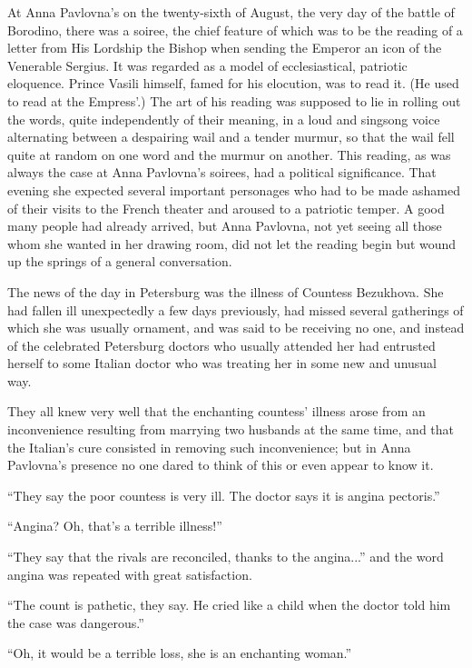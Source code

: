 At Anna Pavlovna's on the twenty-sixth of August, the very day of
the battle of Borodino, there was a soiree, the chief feature of
which was to be the reading of a letter from His Lordship the
Bishop when sending the Emperor an icon of the Venerable
Sergius. It was regarded as a model of ecclesiastical, patriotic
eloquence. Prince Vasili himself, famed for his elocution, was to
read it. (He used to read at the Empress'.) The art of his
reading was supposed to lie in rolling out the words, quite
independently of their meaning, in a loud and singsong voice
alternating between a despairing wail and a tender murmur, so
that the wail fell quite at random on one word and the murmur on
another. This reading, as was always the case at Anna Pavlovna's
soirees, had a political significance. That evening she expected
several important personages who had to be made ashamed of their
visits to the French theater and aroused to a patriotic temper. A
good many people had already arrived, but Anna Pavlovna, not yet
seeing all those whom she wanted in her drawing room, did not let
the reading begin but wound up the springs of a general
conversation.

The news of the day in Petersburg was the illness of Countess
Bezukhova.  She had fallen ill unexpectedly a few days
previously, had missed several gatherings of which she was
usually ornament, and was said to be receiving no one, and
instead of the celebrated Petersburg doctors who usually attended
her had entrusted herself to some Italian doctor who was treating
her in some new and unusual way.

They all knew very well that the enchanting countess' illness
arose from an inconvenience resulting from marrying two husbands
at the same time, and that the Italian's cure consisted in
removing such inconvenience; but in Anna Pavlovna's presence no
one dared to think of this or even appear to know it.

``They say the poor countess is very ill. The doctor says it is
angina pectoris.''

``Angina? Oh, that's a terrible illness!''

``They say that the rivals are reconciled, thanks to the
angina...'' and the word angina was repeated with great
satisfaction.

``The count is pathetic, they say. He cried like a child when the
doctor told him the case was dangerous.''

``Oh, it would be a terrible loss, she is an enchanting woman.''

